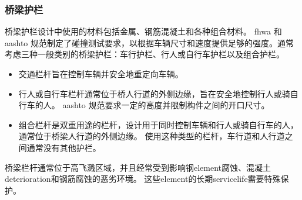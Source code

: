 \subsubsection{桥梁护栏}
桥梁护栏设计中使用的材料包括金属、钢筋混凝土和各种组合材料。 \gls*{fhwa} 和 \gls*{aashto} 规范制定了碰撞测试要求，以根据车辆尺寸和速度提供足够的强度。通常考虑三种一般类别的桥梁护栏：车行护栏、行人或自行车护栏以及组合护栏。

\begin{itemize}
  \item 交通栏杆旨在控制车辆并安全地重定向车辆。
  \item 行人或自行车栏杆通常位于桥人行道的外侧边缘，旨在安全地控制行人或骑自行车的人。 \acrshort*{aashto} 规范要求一定的高度并限制构件之间的开口尺寸。
  \item 组合栏杆是双重用途的栏杆，设计用于同时控制车辆和行人或骑自行车的人，通常位于桥梁人行道的外侧边缘。 使用这种类型的栏杆，车行道和人行道之间通常没有其他护栏。
\end{itemize}

桥梁栏杆通常位于高飞溅区域，并且经常受到影响钢\gls*{element}腐蚀、混凝土\gls*{deterioration}和钢筋腐蚀的恶劣环境。 这些\gls*{element}的长期\gls*{servicelife}需要特殊保护。

